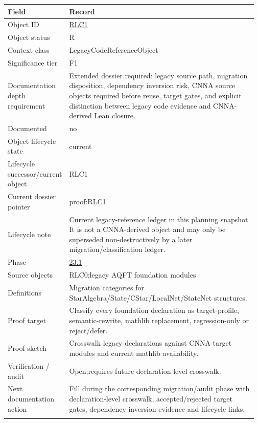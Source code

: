 \begin{longtable}{L{0.16\linewidth} L{0.81\linewidth}}
\hline
\textbf{Field} & \textbf{Record}\\
\hline
Object ID & \hyperlink{object-row-RLC1}{RLC1}\\
\hline\addlinespace[0.20em]
Object status & R\\
\hline\addlinespace[0.20em]
Context class & LegacyCodeReferenceObject\\
\hline\addlinespace[0.20em]
Significance tier & F1\\
\hline\addlinespace[0.20em]
Documentation depth requirement & Extended dossier required: legacy source path, migration disposition, dependency inversion risk, CNNA source objects required before reuse, target gates, and explicit distinction between legacy code evidence and CNNA-derived Lean closure.\\
\hline\addlinespace[0.20em]
Documented & no\\
\hline\addlinespace[0.20em]
Object lifecycle state & current\\
\hline\addlinespace[0.20em]
Lifecycle successor/\allowbreak{}current object & RLC1\\
\hline\addlinespace[0.20em]
Current dossier pointer & proof:RLC1\\
\hline\addlinespace[0.20em]
Lifecycle note & Current legacy-reference ledger in this planning snapshot. It is not a CNNA-derived object and may only be superseded non-destructively by a later migration/\allowbreak{}classification ledger.\\
\hline\addlinespace[0.20em]
Phase & \hyperlink{phase-row-23-1}{23.1}\\
\hline\addlinespace[0.20em]
Source objects & RLC0;\newline legacy AQFT foundation modules\\
\hline\addlinespace[0.20em]
Definitions & Migration categories for StarAlgebra/\allowbreak{}State/\allowbreak{}CStar/\allowbreak{}LocalNet/\allowbreak{}StateNet structures.\\
\hline\addlinespace[0.20em]
Proof target & Classify every foundation declaration as target-profile, semantic-rewrite, mathlib replacement, regression-only or reject/\allowbreak{}defer.\\
\hline\addlinespace[0.20em]
Proof sketch & Crosswalk legacy declarations against CNNA target modules and current mathlib availability.\\
\hline\addlinespace[0.20em]
Verification /\allowbreak{} audit & Open;\newline requires future declaration-level crosswalk.\\
\hline\addlinespace[0.20em]
Next documentation action & Fill during the corresponding migration/\allowbreak{}audit phase with declaration-level crosswalk, accepted/\allowbreak{}rejected target gates, dependency inversion evidence and lifecycle links.\\
\hline\addlinespace[0.20em]
\end{longtable}
